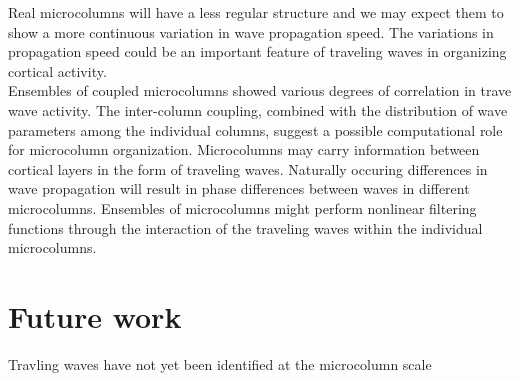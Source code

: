 \documentclass[a4paper,11pt]{article}
\begin{document}
Real microcolumns will have a less regular structure and we may expect them to show a more continuous variation in wave propagation speed. 
The variations in propagation speed could be an important feature of traveling waves in organizing cortical activity.
\\
Ensembles of coupled microcolumns showed various degrees of correlation in trave wave activity. 
The inter-column coupling, combined with the distribution of wave parameters among the individual columns, suggest a possible computational role for microcolumn organization.
Microcolumns may carry information between cortical layers in the form of traveling waves. 
Naturally occuring differences in wave propagation will result in phase differences between waves in different microcolumns.
Ensembles of microcolumns might perform nonlinear filtering functions through the interaction of the traveling waves within the individual microcolumns.

\section{Future work}
Travling waves have not yet been identified at the microcolumn scale


\clearpage
\printbibliography
\end{document}
